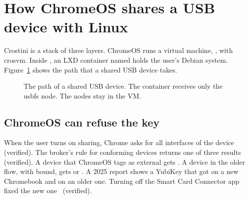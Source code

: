 \section{How ChromeOS shares a USB device with Linux}
\label{sec:crostini}

Crostini is a stack of three layers. ChromeOS runs a virtual machine,
, with crosvm. Inside , an LXD container named
 holds the user's Debian system. Figure~\ref{fig:crostini}
shows the path that a shared USB device takes.

\begin{figure}[t]
\centering
{}
\caption{The path of a shared USB device. The container receives only the
usbfs node. The  nodes stay in the VM.}
\label{fig:crostini}
\end{figure}

\subsection{ChromeOS can refuse the key}

When the user turns on sharing, Chrome asks  for all
interfaces of the device~\cite{crosusb} (verified). The broker's rule for
conforming devices returns one of three results~\cite{pb} (verified). A
device that ChromeOS tags as external gets . A
device in the older flow, with  bound, gets
 or . A 2025 report shows a YubiKey
that got  on a new Chromebook and  on an
older one. Turning off the Smart Card Connector app fixed the new
one~\cite{cros-scc} (verified).

